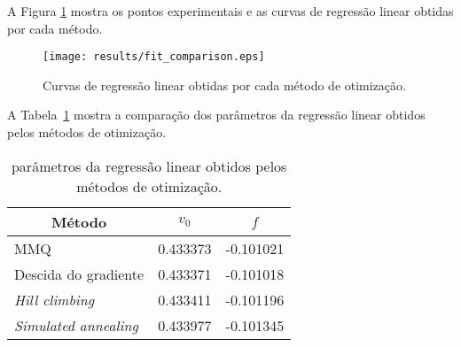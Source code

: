 \documentclass[brazil, 12pt]{article}
\begin{document}
A Figura \ref{fig:fit_comparison} mostra os pontos experimentais e as curvas de regressão linear obtidas por cada método.

\begin{figure}[H]
	\centering
	\texttt{[image: results/fit\_comparison.eps]} %
	\caption{Curvas de regressão linear obtidas por cada método de otimização.} %
	\label{fig:fit_comparison}  %
\end{figure}

A Tabela~\ref{tab:comp} mostra a comparação dos parâmetros da regressão linear obtidos pelos métodos de otimização.

\begin{table}[H]
\centering
\caption{parâmetros da regressão linear obtidos pelos métodos de otimização.}
\label{tab:comp}
\begin{tabular}{|l|l|l|}
\hline
\multicolumn{1}{|c|}{\textbf{Método}}       & \multicolumn{1}{c|}{\textbf{$v_0$}} & \multicolumn{1}{c|}{\textbf{$f$}} \\ \hline
MMQ                         & 0.433373       & -0.101021       \\ \hline
Descida do gradiente        & 0.433371       & -0.101018       \\ \hline
\emph{Hill climbing}        & 0.433411       & -0.101196       \\ \hline
\emph{Simulated annealing}  & 0.433977       & -0.101345       \\ \hline
\end{tabular}
\end{table}
\end{document}
